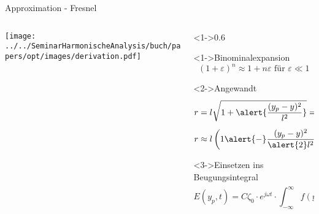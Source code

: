 \begin{frame}{Approximation - Fresnel}
    \begin{columns}
        \begin{column}{0.4\textwidth}
            \centering
            \texttt{[image: ../../SeminarHarmonischeAnalysis/buch/papers/opt/images/derivation.pdf]}
        \end{column}

        \begin{column}<1->{0.6\textwidth}
            \begin{block}<1->{Binominalexpansion}
                \begin{equation*}
                    (1+\varepsilon)^n \approx 1 + n\varepsilon \text{ für } \varepsilon \ll 1
                \end{equation*}
            \end{block}
            \begin{block}<2->{Angewandt}
                \begin{equation*}
                    r
                    =
                    l \sqrt{1 + \alert{\frac{(y_p-y)^2}{l^2}}}
                    =
                    l \biggl(1 + \alert{\frac{(y_p-y)^2}{l^2}}\biggr)^{-\frac{1}{2}}
                \end{equation*}
                \begin{equation*}
                    r
                    \approx
                    l \left(1 \alert{-} \frac{(y_p-y)^2}{\alert{2}l^2}\right)
                    =
                    l - \frac{(y_p-y)^2}{2l}
                \end{equation*}
            \end{block}
            \begin{block}<3->{Einsetzen ins Beugungsintegral}
                \begin{equation*}
                    E(y_p, t)
                    =
                    C\zeta_0 \cdot e^{j\omega t} \cdot \int_{-\infty}^{\infty}f(y)\cdot\frac{e^{-j\vec{k}\cdot\vec{r}}}{r} \,dy
                \end{equation*}
            \end{block}
        \end{column}
    \end{columns}
\end{frame}

